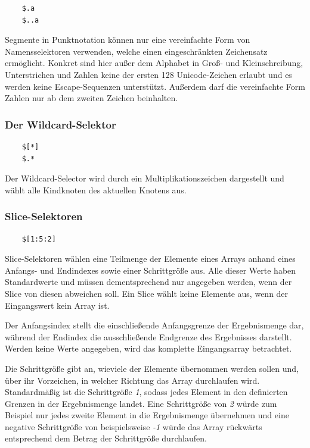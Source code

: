 \documentclass[oneside]{ausarbeitung}
\begin{document}
\begin{lstlisting}
	$.a
	$..a
\end{lstlisting}
	
Segmente in Punktnotation können nur eine vereinfachte Form von Namensselektoren verwenden, welche einen eingeschränkten Zeichensatz ermöglicht. Konkret sind hier außer dem Alphabet in Groß- und Kleinschreibung, Unterstrichen und Zahlen keine der ersten 128 Unicode-Zeichen erlaubt und es werden keine Escape-Sequenzen unterstützt. Außerdem darf die vereinfachte Form Zahlen nur ab dem zweiten Zeichen beinhalten.
	
	
	
\subsubsection{Der Wildcard-Selektor}
	
\begin{lstlisting}
	$[*]
	$.*
\end{lstlisting}
	
Der Wildcard-Selector wird durch ein Multiplikationszeichen dargestellt und wählt alle Kindknoten des aktuellen Knotens aus.
	
	
	
\subsubsection{Slice-Selektoren}
	
\begin{lstlisting}
	$[1:5:2]
\end{lstlisting}
	
Slice-Selektoren wählen eine Teilmenge der Elemente eines Arrays anhand eines Anfangs- und Endindexes sowie einer Schrittgröße aus. Alle dieser Werte haben Standardwerte und müssen dementsprechend nur angegeben werden, wenn der Slice von diesen abweichen soll. Ein Slice wählt keine Elemente aus, wenn der Eingangswert kein Array ist.
	
Der Anfangsindex stellt die einschließende Anfangsgrenze der Ergebnismenge dar, während der Endindex die ausschließende Endgrenze des Ergebnisses darstellt. Werden keine Werte angegeben, wird das komplette Eingangsarray betrachtet.
	 
Die Schrittgröße gibt an, wieviele der Elemente übernommen werden sollen und, über ihr Vorzeichen, in welcher Richtung das Array durchlaufen wird. Standardmäßig ist die Schrittgröße \textit{1}, sodass jedes Element in den definierten Grenzen in der Ergebnismenge landet. Eine Schrittgröße von \textit{2} würde zum Beispiel nur jedes zweite Element in die Ergebnismenge übernehmen und eine negative Schrittgröße von beispielsweise \textit{-1} würde das Array rückwärts entsprechend dem Betrag der Schrittgröße durchlaufen. 
	 
\end{document}
